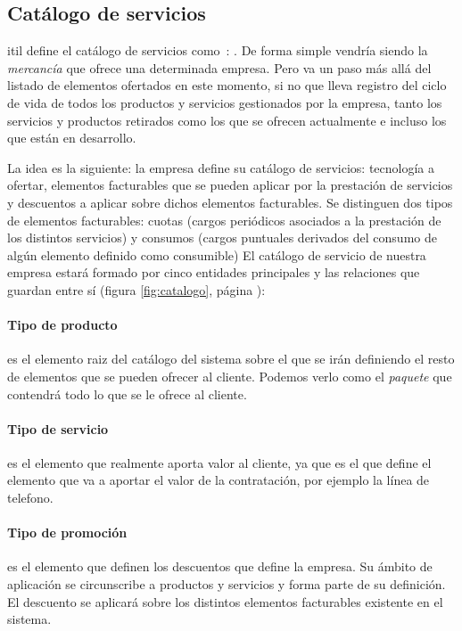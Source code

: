 \subsection{Catálogo de servicios}
\label{sub:catalogo}

\acrshort{itil} define el catálogo de servicios como~\cite{catalogoITIL}:
. De forma simple vendría siendo la \textit{mercancía} que ofrece una determinada empresa. Pero va un paso más allá del listado de elementos ofertados en este momento, si no que  lleva registro del ciclo de vida de todos los productos y servicios gestionados por la empresa, tanto los servicios y productos retirados como los que se ofrecen actualmente e incluso los que están en desarrollo.

La idea es la siguiente: la empresa define su catálogo de servicios: tecnología a ofertar, elementos facturables que se pueden aplicar por la prestación de servicios y descuentos a aplicar sobre dichos elementos facturables. Se distinguen dos tipos de elementos facturables: cuotas (cargos periódicos asociados a la prestación de los distintos servicios) y consumos (cargos puntuales derivados del consumo de algún elemento definido como consumible)
El catálogo de servicio de nuestra empresa estará formado por cinco entidades principales y las relaciones que guardan entre sí (figura \ref{fig:catalogo}, página \pageref{chap:catalogo}):

\paragraph{Tipo de producto} es el elemento raiz del catálogo del sistema sobre el que se irán definiendo el resto de elementos que se pueden ofrecer al cliente. Podemos verlo como el \textit{paquete} que contendrá todo lo que se le ofrece al cliente.
\paragraph{Tipo de servicio} es el elemento que realmente aporta valor al cliente, ya que es el que define el elemento que va a aportar el valor de la contratación, por ejemplo la línea de telefono.
\paragraph{Tipo de promoción} es el elemento que definen los descuentos que define la empresa. Su ámbito de aplicación se circunscribe a productos y servicios y forma parte de su definición. El descuento se aplicará sobre los distintos elementos facturables existente en el sistema.
